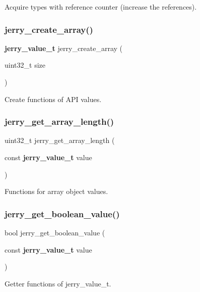 Acquire types with reference counter (increase the references). \mbox{\label{group___core_ga350af573bc4944e11e379a9094cf9030}} 
\subsubsection{jerry\_create\_array()}
{\footnotesize\ttfamily \textbf{ jerry\+\_\+value\+\_\+t} jerry\+\_\+create\+\_\+array (\begin{DoxyParamCaption}\item[{uint32\+\_\+t}]{size }\end{DoxyParamCaption})}

Create functions of A\+PI values. \mbox{\label{group___core_ga6aaeaafc57246fa480d4dbf00258a9da}} 
\subsubsection{jerry\_get\_array\_length()}
{\footnotesize\ttfamily uint32\+\_\+t jerry\+\_\+get\+\_\+array\+\_\+length (\begin{DoxyParamCaption}\item[{const \textbf{ jerry\+\_\+value\+\_\+t}}]{value }\end{DoxyParamCaption})}

Functions for array object values. \mbox{\label{group___core_ga57423f15d4077a77560e518586d780a1}} 
\subsubsection{jerry\_get\_boolean\_value()}
{\footnotesize\ttfamily bool jerry\+\_\+get\+\_\+boolean\+\_\+value (\begin{DoxyParamCaption}\item[{const \textbf{ jerry\+\_\+value\+\_\+t}}]{value }\end{DoxyParamCaption})}

Getter functions of \textquotesingle{}jerry\+\_\+value\+\_\+t\textquotesingle{}. \mbox{\label{group___core_gab02e4e411183b8a4ed02f882035c35ae}} 
